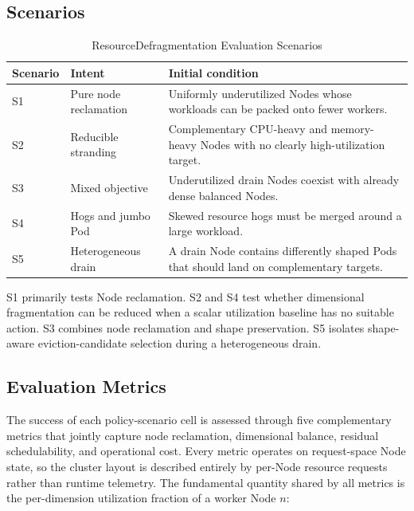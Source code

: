 \subsection{Scenarios}
\label{sec:defrag_scenarios}

\begin{table}[H]
    \centering
    \caption{ResourceDefragmentation Evaluation Scenarios}
    \label{tab:defrag_scenarios}
    \renewcommand{\arraystretch}{1.2}
    \begin{tabular}{l p{3.6cm} p{7.4cm}}
        \hline
        \textbf{Scenario} & \textbf{Intent} & \textbf{Initial condition} \\
        \hline
        S1 & Pure node reclamation & Uniformly underutilized Nodes whose workloads can be packed onto fewer workers. \\
        S2 & Reducible stranding & Complementary CPU-heavy and memory-heavy Nodes with no clearly high-utilization target. \\
        S3 & Mixed objective & Underutilized drain Nodes coexist with already dense balanced Nodes. \\
        S4 & Hogs and jumbo Pod & Skewed resource hogs must be merged around a large workload. \\
        S5 & Heterogeneous drain & A drain Node contains differently shaped Pods that should land on complementary targets. \\
        \hline
    \end{tabular}
\end{table}

S1 primarily tests Node reclamation. S2 and S4 test whether dimensional fragmentation can be reduced when a scalar utilization baseline has no suitable action. S3 combines node reclamation and shape preservation. S5 isolates shape-aware eviction-candidate selection during a heterogeneous drain.

\subsection{Evaluation Metrics}
\label{sec:defrag_metrics}

The success of each policy-scenario cell is assessed through five complementary metrics that jointly capture node reclamation, dimensional balance, residual schedulability, and operational cost. Every metric operates on request-space Node state, so the cluster layout is described entirely by per-Node resource requests rather than runtime telemetry. The fundamental quantity shared by all metrics is the per-dimension utilization fraction of a worker Node \(n\):

